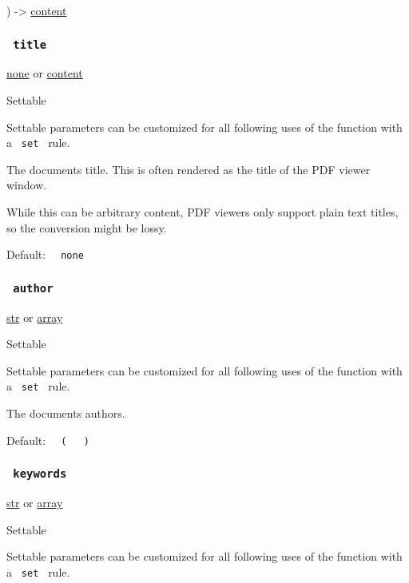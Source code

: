 ) -\textgreater{} \href{/docs/reference/foundations/content/}{content}

\subsubsection{\texorpdfstring{\texttt{\ title\ }}{ title }}\label{parameters-title}

\href{/docs/reference/foundations/none/}{none} {or}
\href{/docs/reference/foundations/content/}{content}

{{ Settable }}

\label{parameters-title-settable-tooltip}
Settable parameters can be customized for all following uses of the
function with a \texttt{\ set\ } rule.

The document\textquotesingle s title. This is often rendered as the
title of the PDF viewer window.

While this can be arbitrary content, PDF viewers only support plain text
titles, so the conversion might be lossy.

Default: \texttt{\ }{\texttt{\ none\ }}\texttt{\ }

\subsubsection{\texorpdfstring{\texttt{\ author\ }}{ author }}\label{parameters-author}

\href{/docs/reference/foundations/str/}{str} {or}
\href{/docs/reference/foundations/array/}{array}

{{ Settable }}

\label{parameters-author-settable-tooltip}
Settable parameters can be customized for all following uses of the
function with a \texttt{\ set\ } rule.

The document\textquotesingle s authors.

Default:
\texttt{\ }{\texttt{\ (\ }}\texttt{\ }{\texttt{\ )\ }}\texttt{\ }

\subsubsection{\texorpdfstring{\texttt{\ keywords\ }}{ keywords }}\label{parameters-keywords}

\href{/docs/reference/foundations/str/}{str} {or}
\href{/docs/reference/foundations/array/}{array}

{{ Settable }}

\label{parameters-keywords-settable-tooltip}
Settable parameters can be customized for all following uses of the
function with a \texttt{\ set\ } rule.

